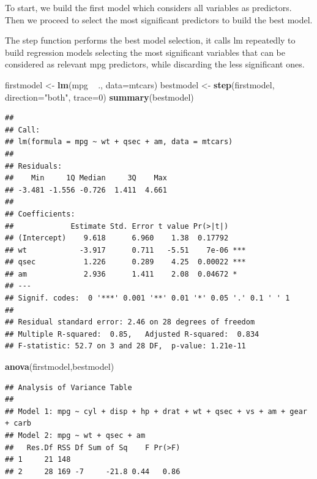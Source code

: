 \documentclass[]{article}
\newenvironment{Shaded}{\begin{snugshade}}{\end{snugshade}}
\newcommand{\KeywordTok}[1]{\textcolor[rgb]{0.13,0.29,0.53}{\textbf{{#1}}}}
\newcommand{\DataTypeTok}[1]{\textcolor[rgb]{0.13,0.29,0.53}{{#1}}}
\newcommand{\DecValTok}[1]{\textcolor[rgb]{0.00,0.00,0.81}{{#1}}}
\newcommand{\StringTok}[1]{\textcolor[rgb]{0.31,0.60,0.02}{{#1}}}
\newcommand{\NormalTok}[1]{{#1}}
\begin{document}
To start, we build the first model which considers all variables as
predictors. Then we proceed to select the most significant predictors to
build the best model.

The step function performs the best model selection, it calls lm
repeatedly to build regression models selecting the most significant
variables that can be considered as relevant mpg predictors, while
discarding the less significant ones.

\begin{Shaded}
\begin{Highlighting}[]
\NormalTok{firstmodel <-}\StringTok{ }\KeywordTok{lm}\NormalTok{(mpg ~}\StringTok{ }\NormalTok{., }\DataTypeTok{data=}\NormalTok{mtcars)}
\NormalTok{bestmodel <-}\StringTok{ }\KeywordTok{step}\NormalTok{(firstmodel, }\DataTypeTok{direction=}\StringTok{"both"}\NormalTok{, }\DataTypeTok{trace=}\DecValTok{0}\NormalTok{)}
\KeywordTok{summary}\NormalTok{(bestmodel)}
\end{Highlighting}
\end{Shaded}

\begin{verbatim}
## 
## Call:
## lm(formula = mpg ~ wt + qsec + am, data = mtcars)
## 
## Residuals:
##    Min     1Q Median     3Q    Max 
## -3.481 -1.556 -0.726  1.411  4.661 
## 
## Coefficients:
##             Estimate Std. Error t value Pr(>|t|)    
## (Intercept)    9.618      6.960    1.38  0.17792    
## wt            -3.917      0.711   -5.51    7e-06 ***
## qsec           1.226      0.289    4.25  0.00022 ***
## am             2.936      1.411    2.08  0.04672 *  
## ---
## Signif. codes:  0 '***' 0.001 '**' 0.01 '*' 0.05 '.' 0.1 ' ' 1
## 
## Residual standard error: 2.46 on 28 degrees of freedom
## Multiple R-squared:  0.85,   Adjusted R-squared:  0.834 
## F-statistic: 52.7 on 3 and 28 DF,  p-value: 1.21e-11
\end{verbatim}

\begin{Shaded}
\begin{Highlighting}[]
\KeywordTok{anova}\NormalTok{(firstmodel,bestmodel)}
\end{Highlighting}
\end{Shaded}

\begin{verbatim}
## Analysis of Variance Table
## 
## Model 1: mpg ~ cyl + disp + hp + drat + wt + qsec + vs + am + gear + carb
## Model 2: mpg ~ wt + qsec + am
##   Res.Df RSS Df Sum of Sq    F Pr(>F)
## 1     21 148                         
## 2     28 169 -7     -21.8 0.44   0.86
\end{verbatim}
\end{document}
